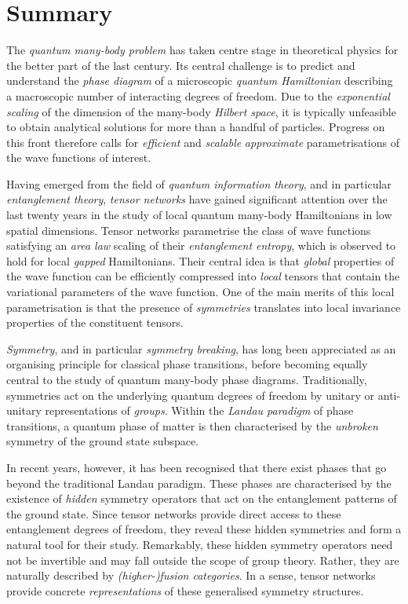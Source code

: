 \chapter*{Summary}
The \emph{quantum many-body problem} has taken centre stage in theoretical physics for the better part of the last century. Its central challenge is to predict and understand the \emph{phase diagram} of a microscopic \emph{quantum Hamiltonian} describing a macroscopic number of interacting degrees of freedom. Due to the \emph{exponential scaling} of the dimension of the many-body \emph{Hilbert space}, it is typically unfeasible to obtain analytical solutions for more than a handful of particles. Progress on this front therefore calls for \emph{efficient} and \emph{scalable} \emph{approximate} parametrisations of the wave functions of interest.

Having emerged from the field of \emph{quantum information theory}, and in particular \emph{entanglement theory}, \emph{tensor networks} have gained significant attention over the last twenty years in the study of local quantum many-body Hamiltonians in low spatial dimensions. Tensor networks parametrise the class of wave functions satisfying an \emph{area law} scaling of their \emph{entanglement entropy}, which is observed to hold for local \emph{gapped} Hamiltonians. Their central idea is that \emph{global} properties of the wave function can be efficiently compressed into \emph{local} tensors that contain the variational parameters of the wave function. One of the main merits of this local parametrisation is that the presence of \emph{symmetries} translates into local invariance properties of the constituent tensors.

\emph{Symmetry}, and in particular \emph{symmetry breaking}, has long been appreciated as an organising principle for classical phase transitions, before becoming equally central to the study of quantum many-body phase diagrams. Traditionally, symmetries act on the underlying quantum degrees of freedom by unitary or anti-unitary representations of \emph{groups}. Within the \emph{Landau paradigm} of phase transitions, a quantum phase of matter is then characterised by the \emph{unbroken} symmetry of the ground state subspace.

In recent years, however, it has been recognised that there exist phases that go beyond the traditional Landau paradigm. These phases are characterised by the existence of \emph{hidden} symmetry operators that act on the entanglement patterns of the ground state. Since tensor networks provide direct access to these entanglement degrees of freedom, they reveal these hidden symmetries and form a natural tool for their study. Remarkably, these hidden symmetry operators need not be invertible and may fall outside the scope of group theory. Rather, they are naturally described by \emph{(higher-)fusion categories}. In a sense, tensor networks provide concrete \emph{representations} of these generalised symmetry structures.

